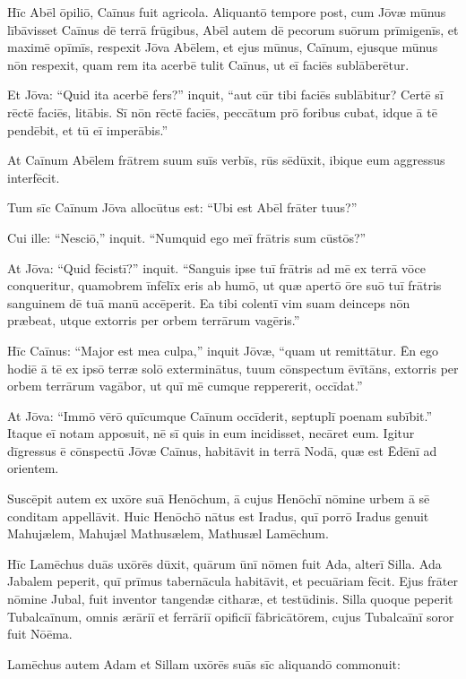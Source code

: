 Hīc Abēl ōpiliō, Caīnus fuit agricola.
\Versus Aliquantō tempore post, cum Jōvæ mūnus lībāvisset Caīnus dē terrā frūgibus,
\Versus Abēl autem dē pecorum suōrum prīmigenīs, et maximē opīmīs, respexit Jōva Abēlem, et ejus mūnus,
\Versus Caīnum, ejusque mūnus nōn respexit, quam rem ita acerbē tulit Caīnus, ut eī faciēs sublāberētur.

\Versus Et Jōva: ``Quid ita acerbē fers?'' inquit, ``aut cūr tibi faciēs sublābitur?
\Versus Certē sī rēctē faciēs, litābis. Sī nōn rēctē faciēs, peccātum prō foribus cubat, idque ā tē pendēbit, et tū eī imperābis.''

\Versus At Caīnum Abēlem frātrem suum suīs verbīs, rūs sēdūxit, ibique eum aggressus interfēcit.

\Versus Tum sīc Caīnum Jōva allocūtus est: ``Ubi est Abēl frāter tuus?''

Cui ille: ``Nesciō,'' inquit. ``Numquid ego meī frātris sum cūstōs?''

\Versus At Jōva: ``Quid fēcistī?'' inquit. ``Sanguis ipse tuī frātris ad mē ex terrā vōce conqueritur,
\Versus quamobrem īnfēlīx eris ab humō, ut quæ apertō ōre suō tuī frātris sanguinem dē tuā manū accēperit.
\Versus Ea tibi colentī vim suam deinceps nōn præbeat, utque extorris per orbem terrārum vagēris.''

\Versus Hīc Caīnus: ``Major est mea culpa,'' inquit Jōvæ, ``quam ut remittātur.
\Versus Ēn ego hodiē ā tē ex ipsō terræ solō exterminātus, tuum cōnspectum ēvītāns, extorris per orbem terrārum vagābor, ut quī mē cumque reppererit, occīdat.''

\Versus At Jōva: ``Immō vērō quīcumque Caīnum occīderit, septuplī poenam subībit.'' Itaque eī notam apposuit, nē sī quis in eum incidisset, necāret eum.
\Versus Igitur dīgressus ē cōnspectū Jōvæ Caīnus, habitāvit in terrā Nodā, quæ est Ēdēnī ad orientem.

\Versus Suscēpit autem ex uxōre suā Henōchum, ā cujus Henōchī nōmine urbem ā sē conditam appellāvit. Huic Henōchō nātus est Iradus, quī porrō Iradus genuit Mahujælem, Mahujæl Mathusælem, Mathusæl Lamēchum.

\Versus Hīc Lamēchus duās uxōrēs dūxit, quārum ūnī nōmen fuit Ada, alterī Silla.
\Versus Ada Jabalem peperit, quī prīmus tabernācula habitāvit, et pecuāriam fēcit.
\Versus Ejus frāter nōmine Jubal, fuit inventor tangendæ citharæ, et testūdinis.
\Versus Silla quoque peperit Tubalcaīnum, omnis ærāriī et ferrāriī opificiī fābricātōrem, cujus Tubalcaīnī soror fuit Nōēma.

\Versus Lamēchus autem Adam et Sillam uxōrēs suās sīc aliquandō commonuit:

